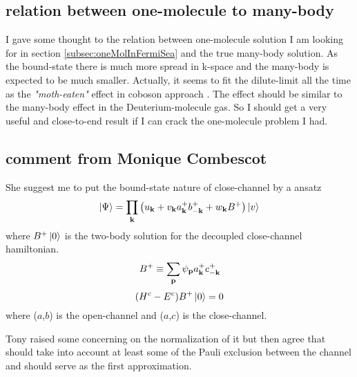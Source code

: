 \subsection{relation between one-molecule to many-body}
I gave some thought to the relation between one-molecule solution I am looking for in section \ref{subsec:oneMolInFermiSea} and the true many-body solution.  As the bound-state there is much more spread in k-space and the many-body is expected to be much smaller.  Actually, it seems to fit the dilute-limit all the time as the \emph{"moth-eaten"} effect in coboson approach \cite{combescotBCS}.  The effect should be similar to the many-body effect in the Deuterium-molecule gas.   So I should get a very useful and close-to-end result if I can crack the one-molecule problem I had.  

\subsection{comment from Monique Combescot\label{sec:MCombescot}}

She suggest me to put the bound-state nature of close-channel by a ansatz
\begin{equation}
 \left|\Psi\right>=\prod_{\mathbf{k}}\left(u_{\mathbf{k}}+v_{\mathbf{k}}{a^+_{\mathbf{k}}}b^+_{-\mathbf{k}}+w_{\mathbf{k}}{B^+}\right)\left|v\right>
\end{equation}
where $B^+\left|0\right>$ is the two-body solution for the decoupled close-channel hamiltonian.
\begin{equation}
 B^+\equiv\sum_{\mathbf{p}}\psi_{\mathbf{p}}{a^+_{\mathbf{k}}}c^+_{-\mathbf{k}}
\end{equation}
\begin{equation}
 (H^c-E^c)B^+\left|0\right>=0
\end{equation}
where ($a$,$b$) is the open-channel and ($a$,$c$) is the close-channel.  

Tony raised some concerning on the normalization of it but then agree that should take into account at least some of the Pauli exclusion between the channel and should serve as the first approximation.  
